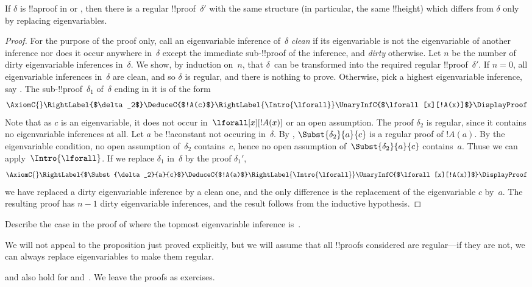 \documentclass[../../../include/open-logic-section]{subfiles}
\begin{document}
\begin{prop}
If $\delta$ is !!a{proof} in  or , then there is a
regular !!{proof}~$\delta'$ with the same structure (in particular, the
same !!{height}) which differs from $\delta$ only by replacing
eigenvariables.
\end{prop}

\begin{proof}
For the purpose of the proof only, call an eigenvariable inference
of~$\delta$ \emph{clean} if its eigenvariable is not the eigenvariable of
another inference nor does it occur anywhere in~$\delta$ except the
immediate sub-!!{proof} of the inference, and \emph{dirty} otherwise.
Let $n$ be the number of dirty eigenvariable inferences in~$\delta$. We
show, by induction on~$n$, that $\delta$~can be transformed into the
required regular !!{proof}~$\delta'$. If $n=0$, all eigenvariable
inferences in~$\delta$ are clean, and so $\delta$ is regular, and there is
nothing to prove. Otherwise, pick a highest eigenvariable inference,
say \Intro{\lforall}. The sub-!!{proof}~$\delta_1$ of~$\delta$ ending in it
is of the form
    \[
    \AxiomC{}
    \RightLabel{$\delta_2$}
    \DeduceC{$!A(c)$}
    \RightLabel{\Intro{\lforall}}
    \UnaryInfC{$\lforall[x][!A(x)]$}
    \DisplayProof
    \]
Note that as $c$ is an eigenvariable, it does not occur
in~$\lforall[x][!A(x)]$ or an open assumption. The proof $\delta_2$ is
regular, since it contains no eigenvariable inferences at all. Let $a$
be !!a{constant} not occuring in~$\delta$. By
, $\Subst{\delta_2}{a}{c}$ is a regular proof
of $!A(a)$. By the eigenvariable condition, no open assumption
of~$\delta_2$ contains~$c$, hence no open assumption
of~$\Subst{\delta_2}{a}{c}$ contains~$a$. Thuse we can
apply~$\Intro{\lforall}$. If we replace $\delta_1$ in~$\delta$ by the
proof $\delta_1'$,
    \[
    \AxiomC{}
    \RightLabel{$\Subst{\delta_2}{a}{c}$}
    \DeduceC{$!A(a)$}
    \RightLabel{\Intro{\lforall}}
    \UnaryInfC{$\lforall[x][!A(x)]$}
    \DisplayProof
    \]
we have replaced a dirty eigenvariable inference by a clean one, and
the only difference is the replacement of the eigenvariable $c$
by~$a$. The resulting proof has $n-1$ dirty eigenvariable inferences,
and the result follows from the inductive hypothesis.
\end{proof}

\begin{prob}
Describe the case in the proof of  where the
topmost eigenvariable inference is~\Elim{\lexists}.
\end{prob}

We will not appeal to the proposition just proved explicitly, but we
will assume that all !!{proof}s considered are regular---if they are
not, we can always replace eigenvariables to make them regular.

 and  also hold for
 and~. We leave the proofs as exercises.
\end{document}
